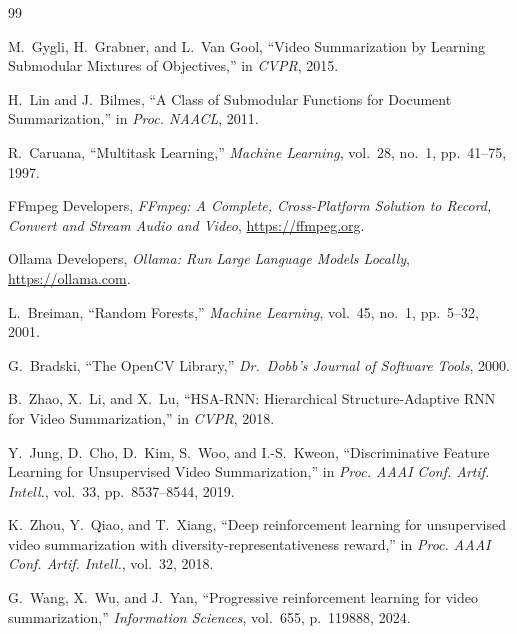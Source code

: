 \documentclass[10pt,conference]{IEEEtran}
\begin{document}
\begin{thebibliography}{99}

M.~Gygli, H.~Grabner, and L.~Van Gool,
``Video Summarization by Learning Submodular Mixtures of Objectives,''
in \textit{CVPR}, 2015.

H.~Lin and J.~Bilmes,
``A Class of Submodular Functions for Document Summarization,''
in \textit{Proc. NAACL}, 2011.

R.~Caruana,
``Multitask Learning,''
\textit{Machine Learning}, vol.~28, no.~1, pp.~41--75, 1997.


FFmpeg Developers,
\textit{FFmpeg: A Complete, Cross-Platform Solution to Record, Convert and
Stream Audio and Video},
\url{https://ffmpeg.org}.

Ollama Developers,
\textit{Ollama: Run Large Language Models Locally},
\url{https://ollama.com}.


L.~Breiman,
``Random Forests,''
\textit{Machine Learning}, vol.~45, no.~1, pp.~5--32, 2001.

G.~Bradski,
``The OpenCV Library,''
\textit{Dr.\ Dobb's Journal of Software Tools}, 2000.


B.~Zhao, X.~Li, and X.~Lu,
``HSA-RNN: Hierarchical Structure-Adaptive RNN for Video Summarization,''
in \textit{CVPR}, 2018.

Y.~Jung, D.~Cho, D.~Kim, S.~Woo, and I.-S.~Kweon,
``Discriminative Feature Learning for Unsupervised Video Summarization,''
in \textit{Proc. AAAI Conf. Artif. Intell.}, vol.~33, pp.~8537--8544, 2019.

K.~Zhou, Y.~Qiao, and T.~Xiang,
``Deep reinforcement learning for unsupervised video summarization with
diversity-representativeness reward,''
in \textit{Proc. AAAI Conf. Artif. Intell.}, vol.~32, 2018.

G.~Wang, X.~Wu, and J.~Yan,
``Progressive reinforcement learning for video summarization,''
\textit{Information Sciences}, vol.~655, p.~119888, 2024.


\end{thebibliography}
\end{document}
